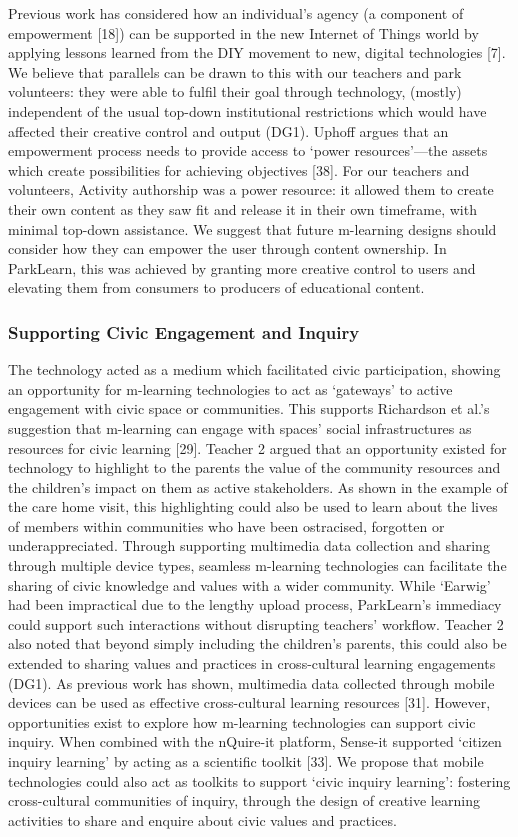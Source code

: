 Previous work has considered how an individual’s agency (a component of empowerment [18]) can be supported in the new Internet of Things world by applying lessons learned from the DIY movement to new, digital technologies [7]. We believe that parallels can be drawn to this with our teachers and park volunteers: they were able to fulfil their goal through technology, (mostly) independent of the usual top-down institutional restrictions which would have affected their creative control and output (DG1). Uphoff argues that an empowerment process needs to provide access to ‘power resources’—the assets which create possibilities for achieving objectives [38]. For our teachers and volunteers, Activity authorship was a power resource: it allowed them to create their own content as they saw fit and release it in their own timeframe, with minimal top-down assistance. We suggest that future m-learning designs should consider how they can empower the user through content ownership. In ParkLearn, this was achieved by granting more creative control to users and elevating them from consumers to producers of educational content.

\subsubsection{Supporting Civic Engagement and Inquiry}

The technology acted as a medium which facilitated civic participation, showing an opportunity for m-learning technologies to act as ‘gateways’ to active engagement with civic space or communities. This supports Richardson et al.’s suggestion that m-learning can engage with spaces’ social infrastructures as resources for civic learning [29]. Teacher 2 argued that an opportunity existed for technology to highlight to the parents the value of the community resources and the children’s impact on them as active stakeholders. As shown in the example of the care home visit, this highlighting could also be used to learn about the lives of members within communities who have been ostracised, forgotten or underappreciated. Through supporting multimedia data collection and sharing through multiple device types, seamless m-learning technologies can facilitate the sharing of civic knowledge and values with a wider community. While ‘Earwig’ had been impractical due to the lengthy upload process, ParkLearn’s immediacy could support such interactions without disrupting teachers’ workflow. Teacher 2 also noted that beyond simply including the children’s parents, this could also be extended to sharing values and practices in cross-cultural learning engagements (DG1). As previous work has shown, multimedia data collected through mobile devices can be used as effective cross-cultural learning resources [31]. However, opportunities exist to explore how m-learning technologies can support civic inquiry. When combined with the nQuire-it platform, Sense-it supported ‘citizen inquiry learning’ by acting as a scientific toolkit [33]. We propose that mobile technologies could also act as toolkits to support ‘civic inquiry learning’: fostering cross-cultural communities of inquiry, through the design of creative learning activities to share and enquire about civic values and practices.

